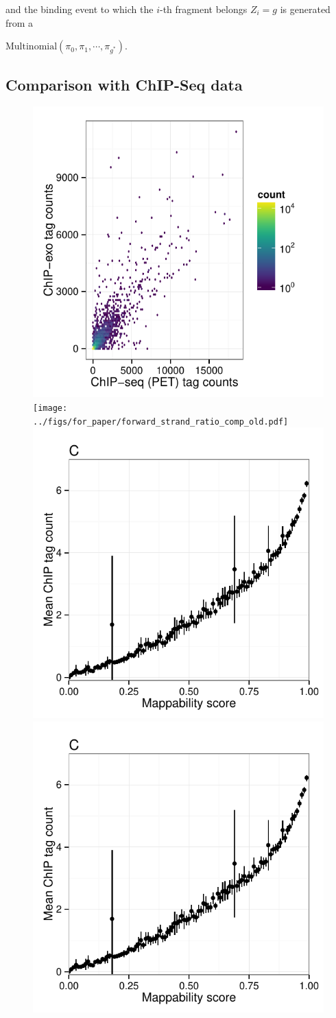 \documentclass[11pt]{article}\usepackage[]{graphicx}\usepackage[]{color}
\begin{document}
and the binding event to which the $i$-th fragment belongs $Z_i = g$
is generated from a

$\mbox{Multinomial}(\pi_0,\pi_1,\cdots,\pi_{g^*})$.




\subsection{Comparison with ChIP-Seq data}
\label{sec:comp_chipseq}


\begin{figure}[H]
  \centering
  \includegraphics[width = .46\textwidth,page = 3 ]{../figs/for_paper/ChIPseqPET_ChIPexo_tagCount_comparison.pdf}
  \texttt{[image: ../figs/for\_paper/forward\_strand\_ratio\_comp\_old.pdf]}
  \includegraphics[width = .46\textwidth,page = 1]{../figs/for_paper/eukaryotic_bias_CTCF.pdf}
  \includegraphics[width = .46\textwidth,page = 2]{../figs/for_paper/eukaryotic_bias_CTCF.pdf}

\end{figure}
\end{document}
